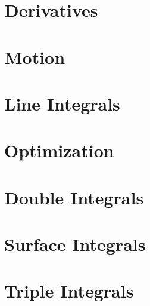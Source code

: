 \documentclass[letterpaper,oneside]{book}%
\newcommand{\wrapup}{
\bmw{\section{Wrap Up}
Once you have finished the problems in the section and feel comfortable with the ideas, create a short one page lesson plan that contains examples of the key ideas.  You will get a chance to teach from this lesson plan prior to taking the exam. Then log on to Brainhoney and download the quiz. Once you have taken the quiz, you can upload your work back to brainhoney and then download the key to see how you did. If you still need to work on mastering some of the ideas, please do so and then demonstrate your mastery though the quiz corrections.}
}
\newcommand{\bmw}[1]{}
\theoremstyle{plain}
\theoremstyle{box}
\theoremstyle{problem}
\begin{document}
\chapter{Derivatives}

\wrapup

\chapter{Motion}

\wrapup

\chapter{Line Integrals}

\wrapup



\chapter{Optimization}

\wrapup


\chapter{Double Integrals}

\wrapup



\chapter{Surface Integrals}

\wrapup

\chapter{Triple Integrals}

\wrapup
\end{document}
